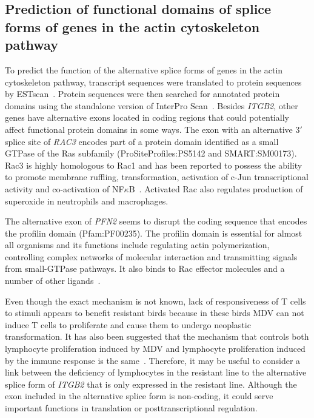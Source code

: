 \subsection{Prediction of functional domains of splice forms of
genes in the actin cytoskeleton pathway}

To predict the function of the alternative splice forms of genes in
the actin cytoskeleton pathway, transcript sequences were translated
to protein sequences by ESTscan~\cite{iseli1999estscan}.  Protein
sequences were then searched for annotated protein domains using the
standalone version of InterPro Scan~\cite{quevillon2005interproscan}.
Besides {\em ITGB2}, other genes have alternative exons located in
coding regions that could potentially affect functional protein
domains in some ways.  The exon with an alternative 3$\prime$ splice
site of {\em RAC3} encodes part of a protein domain identified as a
small GTPase of the Ras subfamily (ProSiteProfiles:PS5142 and
SMART:SM00173).  Rac3 is highly homologous to Rac1 and has been
reported to possess the ability to promote membrane ruffling,
transformation, activation of c-Jun transcriptional activity and
co-activation of NF$\kappa$B~\cite{werbajh2000rac}.  Activated Rac
also regulates production of superoxide in neutrophils and
macrophages.

The alternative exon of {\em PFN2} seems to disrupt the coding
sequence that encodes the profilin domain (Pfam:PF00235).  The
profilin domain is essential for almost all organisms and its
functions include regulating actin polymerization, controlling
complex networks of molecular interaction and transmitting signals
from small-GTPase pathways.  It also binds to Rac effector
molecules and a number of other ligands~\cite{witke2004role}.

Even though the exact mechanism is not known, lack of responsiveness
of T cells to stimuli appears to benefit resistant birds because in
these birds MDV can not induce T cells to proliferate and cause them
to undergo neoplastic transformation.  It has also been suggested that
the mechanism that controls both lymphocyte proliferation induced by
MDV and lymphocyte proliferation induced by the immune response is the
same~\cite{pazderka1975histocompatibility}.  Therefore, it may be
useful to consider a link between the deficiency of lymphocytes in the
resistant line to the alternative splice form of {\em ITGB2} that is
only expressed in the resistant line.  Although the exon included in
the alternative splice form is non-coding, it could serve important
functions in translation or posttranscriptional regulation.

